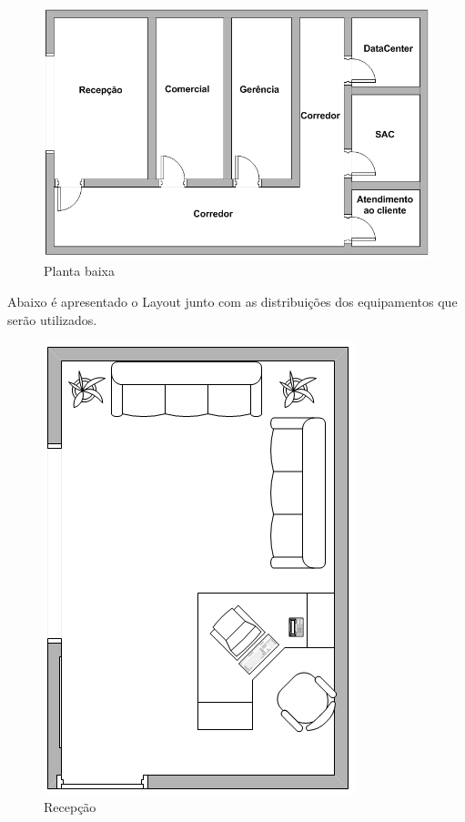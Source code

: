\documentclass[	DIV=calc,%
							paper=a4,%
							fontsize=12pt,%
							onecolumn]{scrartcl}	 					%
\begin{document}
\begin{figure}
	\centering
	\includegraphics[height=\textwidth]{planta-baixa}
	\caption{Planta baixa}
	\label{planta-baixa}
	\end{figure}

Abaixo é apresentado o Layout junto com as distribuições dos equipamentos que serão utilizados.

\begin{figure}
	\centering
	\includegraphics[height=\textwidth,angle=90]{recepcao}
	\caption{Recepção}
	\label{recepcao}
\end{figure}
\end{document}
